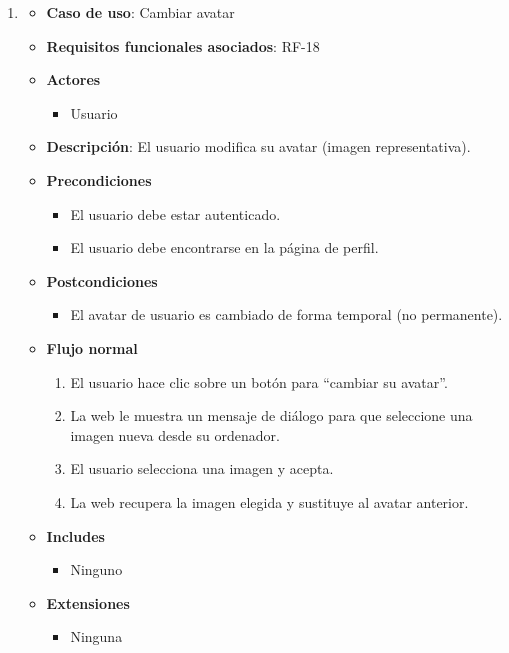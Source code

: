 \begin{enumerate}
\item %
  \begin{itemize}
  \item \textbf{Caso de uso}: Cambiar avatar
  \item \textbf{Requisitos funcionales asociados}: RF-18
  \item \textbf{Actores}
    \begin{itemize}
    \item Usuario
    \end{itemize}
  \item \textbf{Descripción}: El usuario modifica su avatar (imagen representativa).
  \item \textbf{Precondiciones}
    \begin{itemize}
    \item El usuario debe estar autenticado.
    \item El usuario debe encontrarse en la página de perfil.
    \end{itemize}
  \item \textbf{Postcondiciones}
    \begin{itemize}
    \item El avatar de usuario es cambiado de forma temporal (no permanente).
    \end{itemize}
  \item \textbf{Flujo normal}
    \begin{enumerate}
    \item El usuario hace clic sobre un botón para ``cambiar su avatar''.
    \item La web le muestra un mensaje de diálogo para que seleccione una imagen nueva desde su ordenador.
    \item El usuario selecciona una imagen y acepta.
    \item La web recupera la imagen elegida y sustituye al avatar anterior.
    \end{enumerate}
  \item \textbf{Includes}
    \begin{itemize}
    \item Ninguno
    \end{itemize}
  \item \textbf{Extensiones}
    \begin{itemize}
    \item Ninguna
    \end{itemize}
  \end{itemize}


\end{enumerate}
